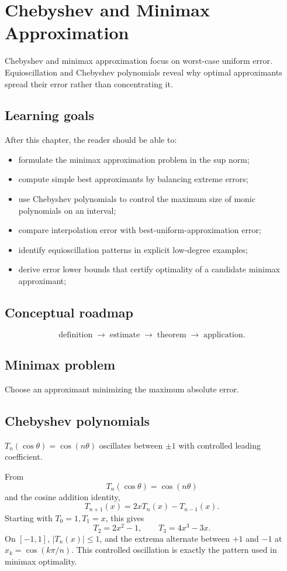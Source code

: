 \chapter{Chebyshev and Minimax Approximation}
\label{ch:ii22}

Chebyshev and minimax approximation focus on worst-case uniform error. Equioscillation and Chebyshev polynomials reveal why optimal approximants spread their error rather than concentrating it.

\section*{Learning goals}
After this chapter, the reader should be able to:
\begin{itemize}
\item formulate the minimax approximation problem in the sup norm;
\item compute simple best approximants by balancing extreme errors;
\item use Chebyshev polynomials to control the maximum size of monic polynomials on an interval;
\item compare interpolation error with best-uniform-approximation error;
\item identify equioscillation patterns in explicit low-degree examples;
\item derive error lower bounds that certify optimality of a candidate minimax approximant;
\end{itemize}
\section*{Conceptual roadmap}
\[
\boxed{\text{definition}\;\longrightarrow\;\text{estimate}\;\longrightarrow\;\text{theorem}\;\longrightarrow\;\text{application}.}
\]

\section{Minimax problem}
Choose an approximant minimizing the maximum absolute error.

\section{Chebyshev polynomials}
$T_n(\cos\theta)=\cos(n\theta)$ oscillates between $\pm1$ with controlled leading coefficient.


\begin{example}\label{ex:ii22-expand-01}
From
\[
T_n(\cos\theta)=\cos(n\theta)
\]
and the cosine addition identity,
\[
T_{n+1}(x)=2xT_n(x)-T_{n-1}(x).
\]
Starting with \(T_0=1,T_1=x\), this gives
\[
T_2=2x^2-1,\qquad T_3=4x^3-3x.
\]
On \([-1,1]\), \(|T_n(x)|\le1\), and the extrema alternate between \(+1\)
and \(-1\) at \(x_k=\cos(k\pi/n)\). This controlled oscillation is exactly the
pattern used in minimax optimality.
\end{example}

